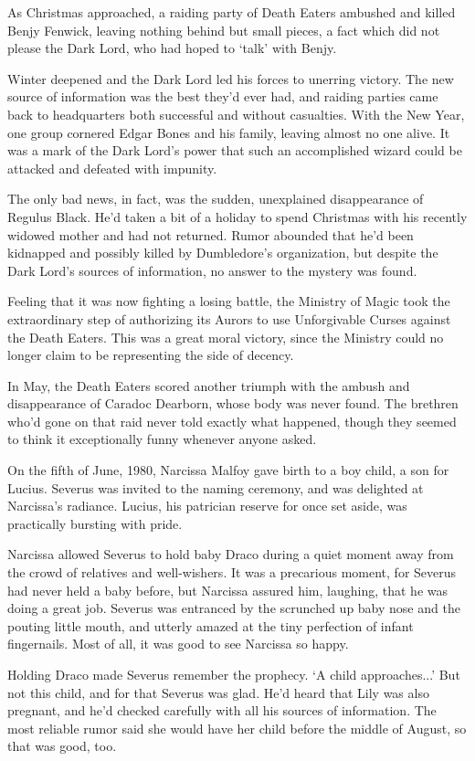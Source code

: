 \documentclass[a4paper,11pt]{article}
\begin{document}
As Christmas approached, a raiding party of Death Eaters ambushed and killed Benjy Fenwick, leaving nothing behind but small pieces, a fact which did not please the Dark Lord, who had hoped to `talk' with Benjy.

Winter deepened and the Dark Lord led his forces to unerring victory. The new source of information was the best they'd ever had, and raiding parties came back to headquarters both successful and without casualties. With the New Year, one group cornered Edgar Bones and his family, leaving almost no one alive. It was a mark of the Dark Lord's power that such an accomplished wizard could be attacked and defeated with impunity.

The only bad news, in fact, was the sudden, unexplained disappearance of Regulus Black. He'd taken a bit of a holiday to spend Christmas with his recently widowed mother and had not returned. Rumor abounded that he'd been kidnapped and possibly killed by Dumbledore's organization, but despite the Dark Lord's sources of information, no answer to the mystery was found.

Feeling that it was now fighting a losing battle, the Ministry of Magic took the extraordinary step of authorizing its Aurors to use Unforgivable Curses against the Death Eaters. This was a great moral victory, since the Ministry could no longer claim to be representing the side of decency.

In May, the Death Eaters scored another triumph with the ambush and disappearance of Caradoc Dearborn, whose body was never found. The brethren who'd gone on that raid never told exactly what happened, though they seemed to think it exceptionally funny whenever anyone asked.

On the fifth of June, 1980, Narcissa Malfoy gave birth to a boy child, a son for Lucius. Severus was invited to the naming ceremony, and was delighted at Narcissa's radiance. Lucius, his patrician reserve for once set aside, was practically bursting with pride.

Narcissa allowed Severus to hold baby Draco during a quiet moment away from the crowd of relatives and well-wishers. It was a precarious moment, for Severus had never held a baby before, but Narcissa assured him, laughing, that he was doing a great job. Severus was entranced by the scrunched up baby nose and the pouting little mouth, and utterly amazed at the tiny perfection of infant fingernails. Most of all, it was good to see Narcissa so happy.

Holding Draco made Severus remember the prophecy. `A child approaches...' But not this child, and for that Severus was glad. He'd heard that Lily was also pregnant, and he'd checked carefully with all his sources of information. The most reliable rumor said she would have her child before the middle of August, so that was good, too.
\end{document}
